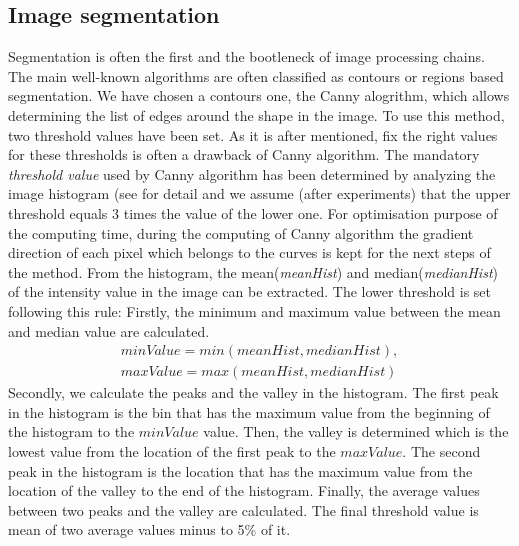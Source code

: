 \documentclass[twoside,twocolumn,10pt]{article}
\begin{document}
\subsection{Image segmentation}
Segmentation is often the first and the bootleneck of image processing
chains. The main well-known algorithms are often classified as contours
or regions based segmentation. We have chosen a contours one, the
Canny alogrithm\cite{canny1986computational}, which allows determining the list of edges around the shape in the image. To use this method, two threshold values have been set. As it is after mentioned, fix the right values for these thresholds is often a drawback of Canny algorithm\cite{adaptiveCanny}. The mandatory \textit{threshold
  value} used by Canny algorithm has been determined by analyzing the image
histogram (see \cite{leestimating} for detail and we assume (after experiments) that the
upper threshold equals 3 times the value of the lower one. For
optimisation purpose of the computing time, during the computing of Canny algorithm the gradient direction of each pixel which belongs to the
curves is kept for the next steps of the method. From the histogram, the mean(\textit{meanHist}) and median(\textit{medianHist}) of the intensity value in the image can be extracted. The lower threshold is set following this rule: Firstly, the minimum and maximum value between the mean and median value are calculated.
\begin{equation}
\begin{aligned}
	minValue = min(meanHist, medianHist), \\
	maxValue = max(meanHist, medianHist)
	\end{aligned}
\end{equation}
Secondly, we calculate the peaks and the valley in the histogram. The first peak in the histogram is the bin that has the maximum value from the beginning of the histogram to the \textit{$minValue$} value. Then, the valley is determined which is the lowest value from the location of the first peak to the \textit{$maxValue$}. The second peak in the histogram is the location that has the maximum value from the location of the valley to the end of the histogram. Finally, the average values between two peaks and the valley are calculated. The final threshold value is mean of two average values minus to 5\% of it.
\end{document}
